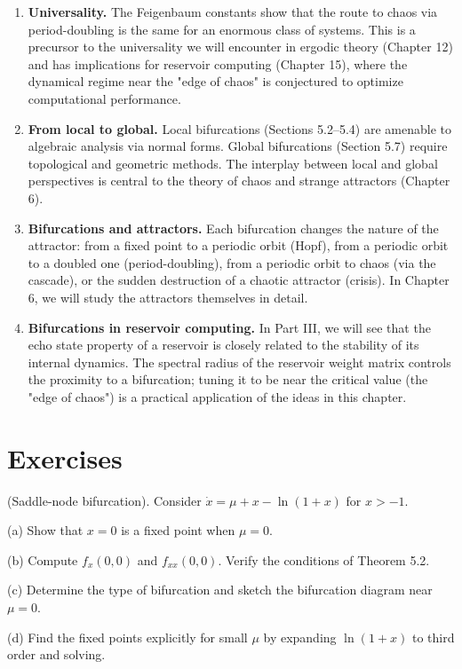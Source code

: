 \begin{enumerate}[nosep]
  \item \textbf{Universality.} The Feigenbaum constants show that the route to chaos via period-doubling is the same for an enormous class of systems. This is a precursor to the universality we will encounter in ergodic theory (Chapter 12) and has implications for reservoir computing (Chapter 15), where the dynamical regime near the "edge of chaos" is conjectured to optimize computational performance.

  \item \textbf{From local to global.} Local bifurcations (Sections 5.2--5.4) are amenable to algebraic analysis via normal forms. Global bifurcations (Section 5.7) require topological and geometric methods. The interplay between local and global perspectives is central to the theory of chaos and strange attractors (Chapter 6).

  \item \textbf{Bifurcations and attractors.} Each bifurcation changes the nature of the attractor: from a fixed point to a periodic orbit (Hopf), from a periodic orbit to a doubled one (period-doubling), from a periodic orbit to chaos (via the cascade), or the sudden destruction of a chaotic attractor (crisis). In Chapter 6, we will study the attractors themselves in detail.

  \item \textbf{Bifurcations in reservoir computing.} In Part III, we will see that the echo state property of a reservoir is closely related to the stability of its internal dynamics. The spectral radius of the reservoir weight matrix controls the proximity to a bifurcation; tuning it to be near the critical value (the "edge of chaos") is a practical application of the ideas in this chapter.


\bigskip

\end{enumerate}

\section*{Exercises}

\begin{exercise}
(Saddle-node bifurcation). Consider $\dot{x} = \mu + x - \ln(1 + x)$ for $x > -1$.

(a) Show that $x = 0$ is a fixed point when $\mu = 0$.

(b) Compute $f_x(0, 0)$ and $f_{xx}(0, 0)$. Verify the conditions of Theorem 5.2.

(c) Determine the type of bifurcation and sketch the bifurcation diagram near $\mu = 0$.

(d) Find the fixed points explicitly for small $\mu$ by expanding $\ln(1+x)$ to third order and solving.


\bigskip

\end{exercise}


